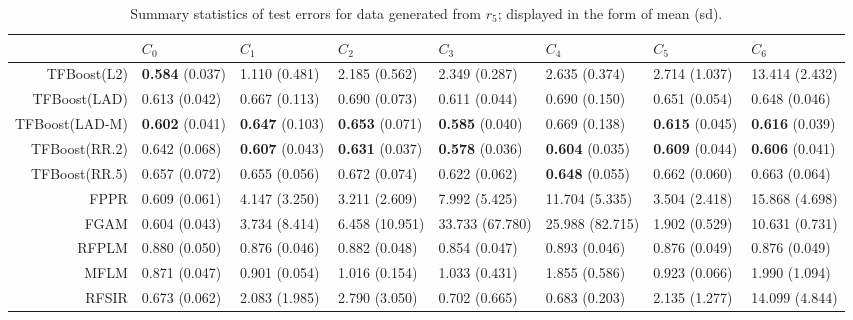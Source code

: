 \begin{table}[H]
\centering
\footnotesize
\begin{tabular}{rlllllll}
  \hline
 & $C_0$ & $C_1$ & $C_2$ & $C_3$ & $C_4$ & $C_5$ & $C_6$ \\ 
  \hline
TFBoost(L2) & \textbf{0.584} (0.037) & 1.110 (0.481) & 2.185 (0.562) & 2.349 (0.287) & 2.635 (0.374) & 2.714 (1.037) & 13.414 (2.432) \\ 
  TFBoost(LAD) & 0.613 (0.042) & 0.667 (0.113) & 0.690 (0.073) & 0.611 (0.044) & 0.690 (0.150) & 0.651 (0.054) & 0.648 (0.046) \\ 
  TFBoost(LAD-M) & \textbf{0.602} (0.041) & \textbf{0.647} (0.103) & \textbf{0.653} (0.071) & \textbf{0.585} (0.040) & 0.669 (0.138) & \textbf{0.615} (0.045) & \textbf{0.616} (0.039) \\ 
  TFBoost(RR.2) & 0.642 (0.068) & \textbf{0.607} (0.043) & \textbf{0.631} (0.037) & \textbf{0.578} (0.036) & \textbf{0.604} (0.035) & \textbf{0.609} (0.044) & \textbf{0.606} (0.041) \\ 
  TFBoost(RR.5) & 0.657 (0.072) & 0.655 (0.056) & 0.672 (0.074) & 0.622 (0.062) & \textbf{0.648} (0.055) & 0.662 (0.060) & 0.663 (0.064) \\ 
  FPPR & 0.609 (0.061) & 4.147 (3.250) & 3.211 (2.609) & 7.992 (5.425) & 11.704 (5.335) & 3.504 (2.418) & 15.868 (4.698) \\ 
  FGAM & 0.604 (0.043) & 3.734 (8.414) & 6.458 (10.951) & 33.733 (67.780) & 25.988 (82.715) & 1.902 (0.529) & 10.631 (0.731) \\ 
  RFPLM & 0.880 (0.050) & 0.876 (0.046) & 0.882 (0.048) & 0.854 (0.047) & 0.893 (0.046) & 0.876 (0.049) & 0.876 (0.049) \\ 
  MFLM & 0.871 (0.047) & 0.901 (0.054) & 1.016 (0.154) & 1.033 (0.431) & 1.855 (0.586) & 0.923 (0.066) & 1.990 (1.094) \\ 
  RFSIR & 0.673 (0.062) & 2.083 (1.985) & 2.790 (3.050) & 0.702 (0.665) & 0.683 (0.203) & 2.135 (1.277) & 14.099 (4.844) \\ 
   \hline
\end{tabular}
\caption{Summary statistics of test errors for data generated from $r_5$; displayed in the form of mean (sd).} 
\end{table}
